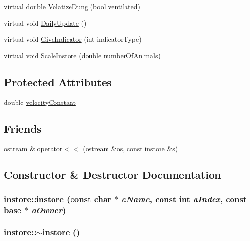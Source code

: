 \begin{DoxyCompactItemize}
\item 
virtual double \hyperlink{classinstore_a6074de577169c2ad9bc7cb041c361771}{VolatizeDung} (bool ventilated)
\item 
virtual void \hyperlink{classinstore_a3235daf3842bf6c4b1e30f56167e69c1}{DailyUpdate} ()
\item 
virtual void \hyperlink{classinstore_afbd76ef97e35ef93c4945667e8341945}{GiveIndicator} (int indicatorType)
\item 
virtual void \hyperlink{classinstore_a589fc8cfe56114a2468991195f494d77}{ScaleInstore} (double numberOfAnimals)
\end{DoxyCompactItemize}
\subsection*{Protected Attributes}
\begin{DoxyCompactItemize}
\item 
double \hyperlink{classinstore_a0eebbd632b677efe27261ea75208dca3}{velocityConstant}
\end{DoxyCompactItemize}
\subsection*{Friends}
\begin{DoxyCompactItemize}
\item 
ostream \& \hyperlink{classinstore_a2ff66b6c5bc714a61ac6aeeebf9b2519}{operator$<$$<$} (ostream \&os, const \hyperlink{classinstore}{instore} \&s)
\end{DoxyCompactItemize}


\subsection{Constructor \& Destructor Documentation}
\hypertarget{classinstore_a3ee4eec37f131b9eb5e2ff5072caafed}{
\subsubsection[{instore}]{\setlength{\rightskip}{0pt plus 5cm}instore::instore (const char $\ast$ {\em aName}, \/  const int {\em aIndex}, \/  const {\bf base} $\ast$ {\em aOwner})}}
\label{classinstore_a3ee4eec37f131b9eb5e2ff5072caafed}
\hypertarget{classinstore_aab1ed501097338b080ad6818f4f3c26a}{
\subsubsection[{$\sim$instore}]{\setlength{\rightskip}{0pt plus 5cm}instore::$\sim$instore ()}}
\label{classinstore_aab1ed501097338b080ad6818f4f3c26a}


